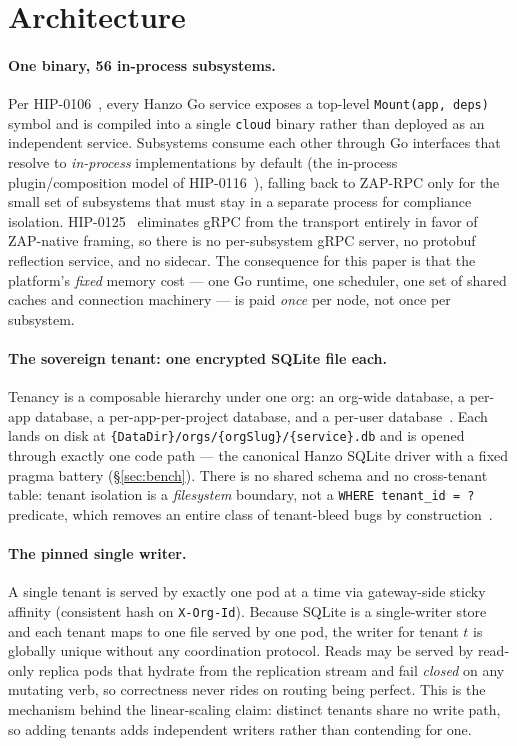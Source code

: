 \documentclass[11pt]{article}
\begin{document}
\section{Architecture}
\label{sec:arch}

\paragraph{One binary, 56 in-process subsystems.}
Per HIP-0106~\cite{hip0106}, every Hanzo Go service exposes a top-level \texttt{Mount(app,
deps)} symbol and is compiled into a single \texttt{cloud} binary rather than deployed as an
independent service. Subsystems consume each other through Go interfaces that resolve to
\emph{in-process} implementations by default (the in-process plugin/composition model of
HIP-0116~\cite{hip0116}), falling back to ZAP-RPC only for the small set of subsystems that must
stay in a separate process for compliance isolation. HIP-0125~\cite{hip0125}
eliminates gRPC from the transport entirely in favor of ZAP-native framing, so there is no
per-subsystem gRPC server, no protobuf reflection service, and no sidecar. The consequence for
this paper is that the platform's \emph{fixed} memory cost --- one Go runtime, one scheduler,
one set of shared caches and connection machinery --- is paid \emph{once} per node, not once per
subsystem.

\paragraph{The sovereign tenant: one encrypted SQLite file each.}
Tenancy is a composable hierarchy under one org: an org-wide database, a per-app database, a
per-app-per-project database, and a per-user database~\cite{hip0302}. Each lands on disk at
\texttt{\{DataDir\}/orgs/\{orgSlug\}/\{service\}.db} and is opened through exactly one code path
--- the canonical Hanzo SQLite driver with a fixed pragma battery (\S\ref{sec:bench}). There is
no shared schema and no cross-tenant table: tenant isolation is a \emph{filesystem} boundary,
not a \texttt{WHERE tenant\_id = ?} predicate, which removes an entire class of
tenant-bleed bugs by construction~\cite{hip0118}.

\paragraph{The pinned single writer.}
A single tenant is served by exactly one pod at a time via gateway-side sticky affinity
(consistent hash on \texttt{X-Org-Id}). Because SQLite is a single-writer store and each tenant
maps to one file served by one pod, the writer for tenant $t$ is globally unique without any
coordination protocol. Reads may be served by read-only replica pods that hydrate from the
replication stream and fail \emph{closed} on any mutating verb, so correctness never rides on
routing being perfect. This is the mechanism behind the linear-scaling claim: distinct tenants
share no write path, so adding tenants adds independent writers rather than contending for one.
\end{document}

